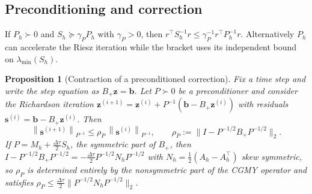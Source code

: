 \documentclass[11pt]{amsart}
\newtheorem{proposition}[theorem]{Proposition}
\theoremstyle{remark}
\newcommand{\Mh}{M_h}
\newcommand{\Ah}{A_h}
\newcommand{\Sh}{S_h}
\newcommand{\norm}[1]{\left\lVert #1\right\rVert}
\newcommand{\dt}{\Delta\tau}
\newcommand{\bb}{\mathbf b}
\newcommand{\zz}{\mathbf z}
\newcommand{\sres}{\mathbf s}
\begin{document}
\subsection{Preconditioning and correction}
\label{ssec:correction-extension}
If $P_h\succ0$ and $\Sh\succeq\gamma_P P_h$ with $\gamma_P>0$, then
$r^\top\Sh^{-1}r\le\gamma_P^{-1}r^\top P_h^{-1}r$.
Alternatively $P_h$ can accelerate the Riesz iteration while the bracket
uses its independent bound on $\lambda_{\min}(\Sh)$.
\begin{proposition}[Contraction of a preconditioned correction]
\label{prop:correction-contraction}
Fix a time step and write the step equation as $B_+\zz=\bb$.  Let $P\succ0$ be
a preconditioner and consider the Richardson iteration
$\zz^{(i+1)}=\zz^{(i)}+P^{-1}(\bb-B_+\zz^{(i)})$ with residuals
$\sres^{(i)}=\bb-B_+\zz^{(i)}$.  Then
\begin{equation}
  \norm{\sres^{(i+1)}}_{P^{-1}}\le\rho_P\,\norm{\sres^{(i)}}_{P^{-1}},
  \qquad
  \rho_P:=\bigl\lVert I-P^{-1/2}B_+P^{-1/2}\bigr\rVert_2 .
  \label{eq:contraction}
\end{equation}
If $P=\Mh+\tfrac{\dt}{2}\Sh$, the symmetric part of $B_+$, then
$I-P^{-1/2}B_+P^{-1/2}=-\tfrac{\dt}{2}P^{-1/2}N_hP^{-1/2}$ with
$N_h=\tfrac12(\Ah-\Ah^\top)$ skew symmetric, so $\rho_P$ is determined
entirely by the nonsymmetric part of the CGMY operator and satisfies
$\rho_P\le\tfrac{\dt}{2}\lVert P^{-1/2}N_hP^{-1/2}\rVert_2$.
\end{proposition}
\end{document}
